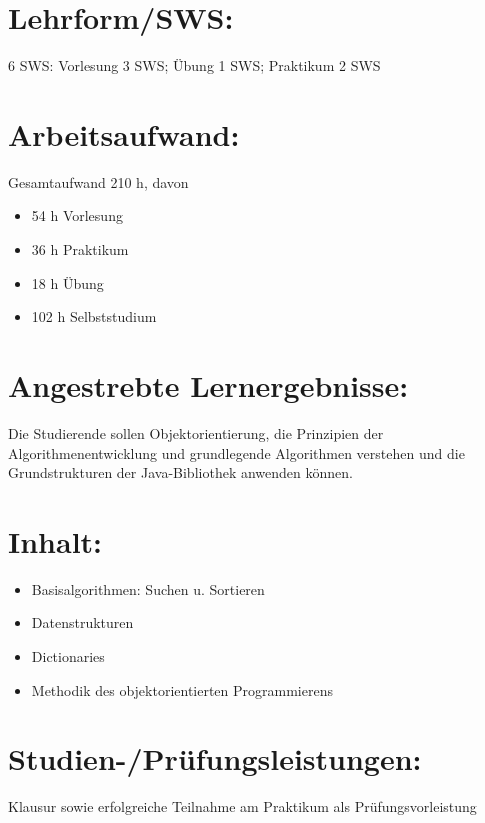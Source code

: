 \section*{Lehrform/SWS:}\label{lehrformsws-1}

6 SWS: Vorlesung 3 SWS; Übung 1 SWS; Praktikum 2 SWS

\section*{Arbeitsaufwand:}\label{arbeitsaufwand-1}

Gesamtaufwand 210 h, davon

\begin{itemize}
\tightlist
\item
  54 h Vorlesung
\item
  36 h Praktikum
\item
  18 h Übung
\item
  102 h Selbststudium
\end{itemize}

\section*{Angestrebte
Lernergebnisse:}\label{angestrebte-lernergebnisse-1}

Die Studierende sollen Objektorientierung, die Prinzipien der
Algorithmenentwicklung und grundlegende Algorithmen verstehen und die
Grundstrukturen der Java-Bibliothek anwenden können.

\section*{Inhalt:}\label{inhalt-1}

\begin{itemize}
\tightlist
\item
  Basisalgorithmen: Suchen u. Sortieren
\item
  Datenstrukturen
\item
  Dictionaries
\item
  Methodik des objektorientierten Programmierens
\end{itemize}

\section*{Studien-/Prüfungsleistungen:}\label{studien-pruxfcfungsleistungen-1}

Klausur sowie erfolgreiche Teilnahme am Praktikum als
Prüfungsvorleistung

